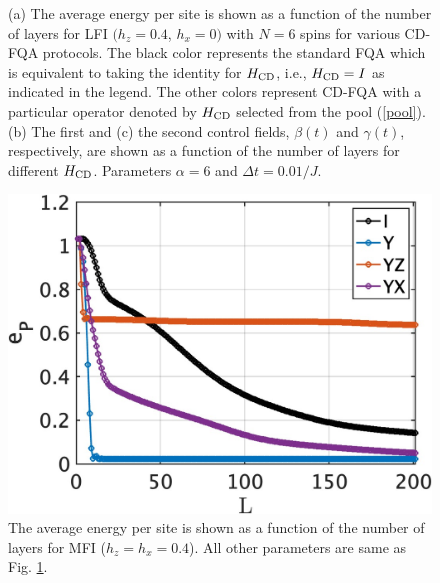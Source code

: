 \documentclass[twocolumn,aps,superscriptaddress,floatfix,longbibliography]{revtex4-2}
\begin{document}
\begin{figure}[tbh!]
\begin{center}
\end{center}
\caption{
(a) The average energy per site is
    shown as a function of the number of layers for LFI 
    $(h_z=0.4$, $h_x=0)$ with $N=6$ spins for various CD-FQA protocols. The black color represents
    the standard FQA which is equivalent to taking
    the identity for $H_{\rm CD}$, i.e., $H_{\rm CD}=I$
    as indicated in the legend.
    The other colors represent CD-FQA with a
    particular operator  denoted by $H_{\rm CD}$ selected from the pool (\ref{pool}).
(b) The first and (c) the second control fields, $\beta(t)$ and
    $\gamma(t)$, respectively, are shown as a function of the
    number of layers for different $H_{\rm CD}$. Parameters $\alpha=6$
    and $\Delta t = 0.01 / J$. %
}
\label{fig:LFI}
\end{figure}

\begin{figure}
\centering
\includegraphics[scale=0.18]{MFIM.jpg}
\caption{
   The average energy per site is shown as a function of the number of
   layers for MFI ($h_z=h_x=0.4$). %
   All other parameters are same as Fig. \ref{fig:LFI}.
}
\label{fig:MFI}
\end{figure}

\end{document}
